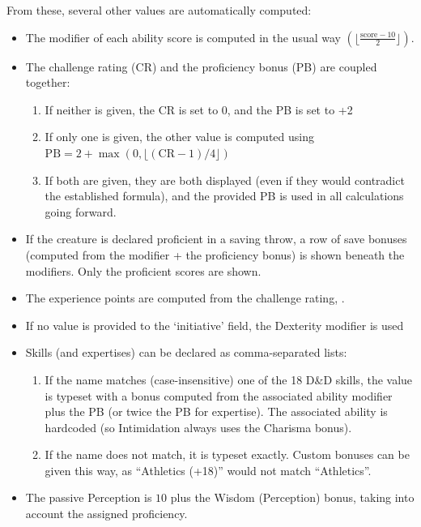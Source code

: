 			From these, several other values are automatically computed:
			\begin{itemize}
				\item The modifier of each ability score is computed in the usual way $(\lfloor \frac{\text{score} - 10}{2} \rfloor)$.
				\item The challenge rating (CR) and the proficiency bonus (PB) are coupled together:
				      \begin{enumerate}[leftmargin=1cm]
					      \item If neither is given, the CR is set to 0, and the PB is set to +2
					      \item If only one is given, the other value is computed using $\text{PB} = 2 + \max\left(0, \lfloor (\text{CR} - 1)/4 \rfloor\right)$
					      \item If both are given, they are both displayed (even if they would contradict the established formula), and the provided PB is used in all calculations going forward.
				      \end{enumerate}
				\item If the creature is declared proficient in a saving throw, a row of save bonuses (computed from the modifier + the proficiency bonus) is shown beneath the modifiers. Only the proficient scores are shown.
				\item The experience points are computed from the challenge rating, .
				\item If no value is provided to the `initiative' field, the Dexterity modifier is used
				\item Skills (and expertises) can be declared as comma-separated lists:
				      \begin{enumerate}[leftmargin=1cm]
					      \item If the name matches (case-insensitive) one of the 18 D\&D skills, the value is typeset with a bonus computed from the associated ability modifier plus the PB (or twice the PB for expertise). The associated ability is hardcoded (so Intimidation always uses the Charisma bonus).
					      \item If the name does not match, it is typeset exactly. Custom bonuses can be given this way, as ``Athletics (+18)'' would not match ``Athletics''.
				      \end{enumerate}
				\item The passive Perception is $10$ plus the Wisdom (Perception) bonus, taking into account the assigned proficiency.
			\end{itemize}
